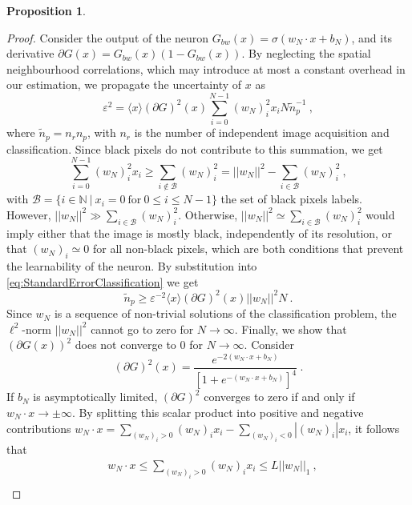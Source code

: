 \documentclass[reprint,
superscriptaddress,
nofootinbib,
aps,
pra,
showkeys
]{revtex4-2}
\newtheorem{proposition}{Proposition}
\begin{document}
\begin{widetext}
\begin{proposition}
\end{proposition}
\begin{proof}
Consider the output of the neuron $G_{bw}(x) = \sigma(w_{N}\cdot x + b_N)$, and its derivative $\partial G(x) = G_{bw}(x)(1-G_{bw}(x))$. By neglecting the spatial neighbourhood correlations, which may introduce at most a constant overhead in our estimation, we propagate the uncertainty of $x$ as
\begin{equation}
	\varepsilon^2 = \langle x \rangle (\partial G)^2(x) \sum_{i=0}^{N-1}(w_N)_i^2 x_i N\tilde{n}^{-1}_p \ ,
	\label{eq:StandardErrorClassification}
\end{equation}
where $\tilde{n}_p = n_r n_p$, with $n_r$ is the number of independent image acquisition and classification. Since black pixels do not contribute to this summation, we get 
\begin{equation}
	\sum_{i=0}^{N-1}(w_N)_i^2 x_i \geq \sum_{i\notin\mathcal{B}}(w_N)_i^2 = ||w_N||^2 - \sum_{i\in\mathcal{B}}(w_N)_i^2 \ ,
\end{equation}
with $\mathcal{B} = \{i\in \mathbb{N} \ | \ x_i = 0 \ \text{for} \ 0 \leq i \leq N - 1 \}$ the set of black pixels labels. However, $||w_N||^2 \gg \sum_{i\in\mathcal{B}}(w_N)_i^2$. Otherwise, $||w_N||^2 \simeq \sum_{i\in\mathcal{B}}(w_N)_i^2$ would imply either that the image is mostly black, independently of its resolution, or that $(w_N)_i \simeq 0$ for all non-black pixels, which are both conditions that prevent the learnability of the neuron. By substitution into \cref{eq:StandardErrorClassification} we get
\begin{equation}
	\tilde{n}_p \geq \varepsilon^{-2} \langle x \rangle (\partial G)^2(x) ||w_N||^2 N \ .
\end{equation}
Since $w_N$ is a sequence of non-trivial solutions of the classification problem, the $\ell^2$-norm $||w_N||^2$ cannot go to zero for $N \to \infty$. Finally, we show that $(\partial G(x))^2$ does not converge to $0$ for $N \to \infty$. Consider
\begin{equation}
	(\partial G)^2(x) = \frac{e^{-2(w_{N}\cdot x + b_N)}}{[1+e^{-(w_{N}\cdot x + b_N)}]^4} \ .
\end{equation}
If $b_{N}$ is asymptotically limited, $(\partial G)^2$ converges to zero if and only if $w_{N}\cdot x \to \pm \infty$. By splitting this scalar product into positive and negative contributions $w_{N}\cdot x = \sum_{(w_{N})_i > 0}(w_{N})_i x_i - \sum_{(w_{N})_i < 0}|(w_{N})_i| x_i$, it follows that
\begin{align}
	&w_{N}\cdot x \leq \sum_{(w_{N})_i > 0}(w_{N})_i x_i \leq L||w_N||_1 \ , \\

\end{align}
\end{proof}
\end{widetext}
\end{document}
